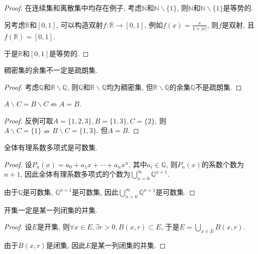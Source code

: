 \documentclass[theorem=false,mathfont=none,openany,sub3section]{easybook}
\begin{document}
\begin{proof}
  在连续集和离散集中均存在例子, 考虑$\mathbb{N}$和$\mathbb{N}\backslash \{1\}$, 则$\mathbb{N}$和$\mathbb{N}\backslash \{1\}$是等势的.\par
  另考虑$\mathbb{R}$和$[0,1]$, 可以构造双射$f:\mathbb{R}\rightarrow [0,1]$, 例如$f(x)=\frac{x}{1+|x|}$, 则$f$是双射, 且$f(\mathbb{R})=[0,1]$.\par
  于是$\mathbb{R}$和$[0,1]$是等势的.\par
\end{proof}

\begin{example}
  稠密集的余集不一定是疏朗集.
\end{example}

\begin{proof}
  考虑$\mathbb{Q}$和$\mathbb{R}\backslash \mathbb{Q}$, 则$\mathbb{Q}$和$\mathbb{R}\backslash \mathbb{Q}$均为稠密集, 但$\mathbb{R}\backslash \mathbb{Q}$的余集$\mathbb{Q}$不是疏朗集.\par
\end{proof}

\begin{example}
  $A \backslash C =  B \backslash C \nRightarrow A = B$.
\end{example}

\begin{proof}
  反例可取$A=\{1,2,3\}, B=\{1,3\}, C=\{2\}$, 则$A \backslash C = \{1\} \nRightarrow B \backslash C = \{1,3\}$. 但$A=B$.\par
\end{proof}

\begin{example}
  全体有理系数多项式是可数集.
\end{example}

\begin{proof}
  设$P_n(x)=a_0+a_1x+\cdots+a_nx^n$, 其中$a_i\in \mathbb{Q}$, 则$P_n(x)$的系数个数为$n+1$, 因此全体有理系数多项式的个数为$\bigcup_{n=0}^{\infty}\mathbb{Q}^{n+1}$.\par
  由于$\mathbb{Q}$是可数集, $\mathbb{Q}^{n+1}$是可数集, 因此$\bigcup_{n=0}^{\infty}\mathbb{Q}^{n+1}$是可数集.\par
\end{proof}

\begin{example}
  开集一定是某一列闭集的并集.
\end{example}

\begin{proof}
  设$E$是开集, 则$\forall x\in E, \exists r>0, B(x,r)\subset E$, 于是$E=\bigcup_{x\in E}B(x,r)$.\par
  由于$B(x,r)$是闭集, 因此$E$是某一列闭集的并集.\par
\end{proof}
\end{document}
